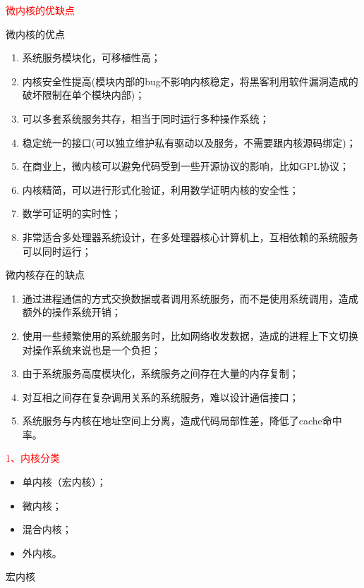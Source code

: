 \documentclass[utf8]{book}
\begin{document}
{\Large \textcolor{red}{微内核的优缺点}}

{\large 微内核的优点}
\begin{enumerate}
	\item 系统服务模块化，可移植性高；
	\item 内核安全性提高(模块内部的bug不影响内核稳定，将黑客利用软件漏洞造成的破坏限制在单个模块内部)；
	\item 可以多套系统服务共存，相当于同时运行多种操作系统；
	\item 稳定统一的接口(可以独立维护私有驱动以及服务，不需要跟内核源码绑定)；
	\item 在商业上，微内核可以避免代码受到一些开源协议的影响，比如GPL协议；
	\item 内核精简，可以进行形式化验证，利用数学证明内核的安全性；
	\item 数学可证明的实时性；
	\item 非常适合多处理器系统设计，在多处理器核心计算机上，互相依赖的系统服务可以同时运行；
\end{enumerate}

{\large 微内核存在的缺点}
\begin{enumerate}
	\item 通过进程通信的方式交换数据或者调用系统服务，而不是使用系统调用，造成额外的操作系统开销；
	\item 使用一些频繁使用的系统服务时，比如网络收发数据，造成的进程上下文切换对操作系统来说也是一个负担；
	\item 由于系统服务高度模块化，系统服务之间存在大量的内存复制；
	\item 对互相之间存在复杂调用关系的系统服务，难以设计通信接口；
	\item 系统服务与内核在地址空间上分离，造成代码局部性差，降低了cache命中率。
\end{enumerate}


{\Large \textcolor{red}{1、内核分类}}
\begin{itemize}
	\item 单内核（宏内核）；
	\item 微内核；
	\item 混合内核；
	\item 外内核。
\end{itemize}

{\large 宏内核}
\end{document}
